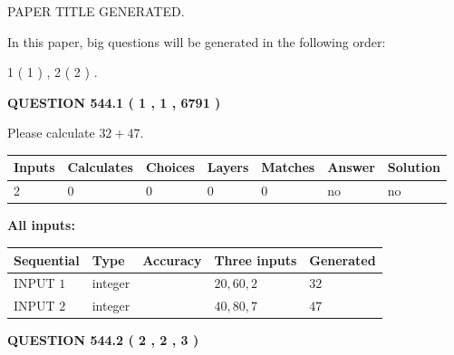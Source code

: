 \documentclass[12pt]{article}
\begin{document}
 
   
   
 PAPER TITLE GENERATED.
   
   
   
\vspace{0.2in}
   
In this paper, big questions will be generated in the following order: 
   
   
   1 ( 1 )
 ,
   2 ( 2 )
 .
  
\vspace{0.2in}
  
{\textbf{\Large{QUESTION
544.1 
 ( 1 , 1 , 6791 )
}}}
  
  
 
Please calculate $ %
32 +  %
47 $.
 
 
   
   
   
   
\noindent\begin{tabular}{|l|l|l|l|l|l|l|}
 \hline
Inputs & Calculates & Choices & Layers & Matches & Answer & Solution \\ \hline
 2  & 
 0  & 
 0
  & 
 0  & 
 0  & 
  no & 
  no 
  \\ \hline
 \end{tabular}
   
   
   
   
\noindent{}
   
   
   
   
\noindent\vspace{0.1in}\hspace{-0.08in} {\textbf{\Large{All inputs: }}}
   
   
  
  
\noindent\begin{tabular}{|l|l|l|l|l|}
\hline
 Sequential & Type & Accuracy & Three inputs & Generated \\ 
\hline
 
 
  INPUT $  1 $ & integer &  & $
 20
 , 
 60
 , 
 2
 $ & $ 32 $ 
 \\  \hline  
 
 
  INPUT $  2 $ & integer &  & $
 40
 , 
 80
 , 
 7
 $ & $ 47 $ 
 \\  \hline  
 \end{tabular}
   
   
  
\vspace{0.2in}
  
{\textbf{\Large{QUESTION
544.2 
 ( 2 , 2 , 3 )
}}}
  
\end{document}
